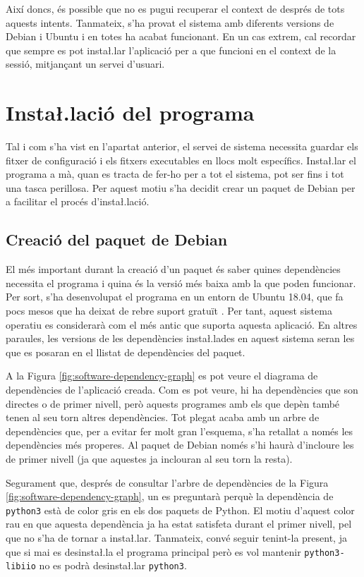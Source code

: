 Així doncs, és possible que no es pugui recuperar el context de 
després de tots aquests intents. Tanmateix, s'ha provat el
sistema amb diferents versions de Debian i Ubuntu i en totes ha acabat funcionant.
En un cas extrem, cal recordar que sempre es pot insta\l.lar l'aplicació per a
que funcioni en el context de la sessió, mitjançant un servei d'usuari.

\section{Insta\l.lació del programa}

Tal i com s'ha vist en l'apartat anterior, el servei de sistema necessita guardar
els fitxer de configuració i els fitxers executables en llocs molt específics.
Insta\l.lar el programa a mà, quan es tracta de fer-ho per a tot el sistema,
pot ser fins i tot una tasca perillosa. Per aquest motiu s'ha decidit crear un
paquet de Debian per a facilitar el procés d'insta\l.lació.

\subsection{Creació del paquet de Debian}

El més important durant la creació d'un paquet és saber quines dependències
necessita el programa i quina és la versió més baixa amb la que poden funcionar.
Per sort, s'ha desenvolupat el programa en un entorn de Ubuntu 18.04, que fa
pocs mesos que ha deixat de rebre suport gratuït \cite{UbuntuSupport}. Per tant,
aquest sistema
operatiu es considerarà com el més antic que suporta aquesta aplicació. En altres
paraules, les versions de les dependències insta\l.lades en aquest sistema seran
les que es posaran en el llistat de dependències del paquet.

A la Figura \ref{fig:software-dependency-graph} es pot veure el diagrama de
dependències de l'aplicació creada. Com es pot veure, hi ha dependències que
son directes o de primer nivell, però aquests programes amb els que depèn també
tenen al seu torn altres dependències. Tot plegat acaba amb un arbre de
dependències que, per a evitar fer molt gran l'esquema, s'ha retallat a només
les dependències més properes. Al paquet de Debian només s'hi haurà d'incloure
les de primer nivell (ja que aquestes ja inclouran al seu torn la resta).



Segurament que, després de consultar l'arbre de dependències de la Figura
\ref{fig:software-dependency-graph}, un es preguntarà perquè la dependència
de \texttt{python3} està de color gris en els dos paquets de Python. El motiu
d'aquest color rau en que aquesta dependència ja ha estat satisfeta durant el
primer nivell, pel que no s'ha de tornar a insta\l.lar. Tanmateix, convé seguir
tenint-la present, ja que si mai es desinsta\l.la el programa principal però es
vol mantenir \texttt{python3-libiio} no es podrà desinsta\l.lar \texttt{python3}.

